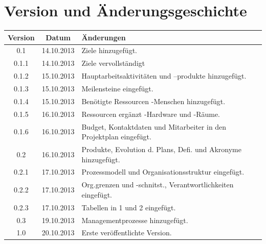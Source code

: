 \documentclass[fontsize=12pt,paper=a4,twoside]{scrartcl}
\begin{document}
  \thispagestyle{fancy}
  \fancyhead{}
  \fancyfoot{}
  \renewcommand{\headrulewidth}{0.4pt}
  \tableofcontents

\newpage



\section*{Version und Änderungsgeschichte}



\begin{tabular}{ccl}
Version & Datum & Änderungen \\
\hline
0.1 & 14.10.2013 & Ziele hinzugefügt.\\
0.1.1 & 14.10.2013 & Ziele vervollständigt\\
0.1.2 & 15.10.2013 & Hauptarbeitsaktivitäten und --produkte hinzugefügt.\\
0.1.3 & 15.10.2013 & Meilensteine eingefügt.\\
0.1.4 & 15.10.2013 & Benötigte Ressourcen -Menschen hinzugefügt.\\
0.1.5 & 16.10.2013 & Ressourcen ergänzt -Hardware und -Räume.\\
0.1.6 & 16.10.2013 & Budget, Kontaktdaten und Mitarbeiter in den Projektplan eingefügt.\\
0.2 & 16.10.2013 &  Produkte, Evolution d. Plans, Defi. und Akronyme hinzugefügt.\\
0.2.1 & 17.10.2013 & Prozessmodell und Organisationsstruktur eingefügt.\\
0.2.2 & 17.10.2013 & Org.grenzen und -schnitst., Verantwortlichkeiten eingefügt.\\
0.2.3 & 17.10.2013 & Tabellen in 1 und 2 eingefügt.\\
0.3 & 19.10.2013 & Managementprozesse hinzugefügt.\\
1.0 & 20.10.2013 & Erste veröffentlichte Version. \\
\end{tabular}
\end{document}
